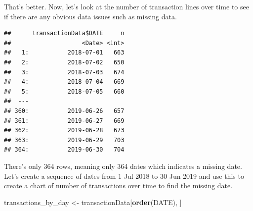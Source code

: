 \documentclass[
]{article}
\newenvironment{Shaded}{\begin{snugshade}}{\end{snugshade}}
\newcommand{\CommentTok}[1]{\textcolor[rgb]{0.56,0.35,0.01}{\textit{#1}}}
\newcommand{\DocumentationTok}[1]{\textcolor[rgb]{0.56,0.35,0.01}{\textbf{\textit{#1}}}}
\newcommand{\FunctionTok}[1]{\textcolor[rgb]{0.13,0.29,0.53}{\textbf{#1}}}
\newcommand{\NormalTok}[1]{#1}
\newcommand{\OtherTok}[1]{\textcolor[rgb]{0.56,0.35,0.01}{#1}}
\newcommand{\SpecialCharTok}[1]{\textcolor[rgb]{0.81,0.36,0.00}{\textbf{#1}}}
\begin{document}
That's better. Now, let's look at the number of transaction lines over
time to see if there are any obvious data issues such as missing data.

\begin{Shaded}
\end{Shaded}

\begin{verbatim}
##      transactionData$DATE     n
##                    <Date> <int>
##   1:           2018-07-01   663
##   2:           2018-07-02   650
##   3:           2018-07-03   674
##   4:           2018-07-04   669
##   5:           2018-07-05   660
##  ---                           
## 360:           2019-06-26   657
## 361:           2019-06-27   669
## 362:           2019-06-28   673
## 363:           2019-06-29   703
## 364:           2019-06-30   704
\end{verbatim}

There's only 364 rows, meaning only 364 dates which indicates a missing
date. Let's create a sequence of dates from 1 Jul 2018 to 30 Jun 2019
and use this to create a chart of number of transactions over time to
find the missing date.

\begin{Shaded}
\begin{Highlighting}[]
\NormalTok{transactions\_by\_day }\OtherTok{\textless{}{-}}\NormalTok{ transactionData[}\FunctionTok{order}\NormalTok{(DATE), ]}
\end{Highlighting}
\end{Shaded}
\end{document}
